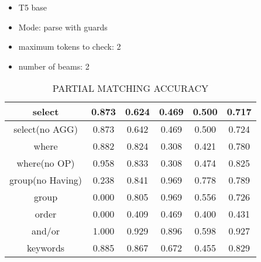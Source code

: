 \begin{itemize}
    \item T5 base
    \item Mode: parse with guards
    \item maximum tokens to check: 2
    \item number of beams: 2
\end{itemize}

\begin{table}[h!]
    \centering
    \begin{tabular}{|c|c|c|c|c|c|}
        \hline
        select           & 0.873 & 0.624 & 0.469 & 0.500 & 0.717 \\ \hline
        select(no AGG)   & 0.873 & 0.642 & 0.469 & 0.500 & 0.724 \\ \hline
        where            & 0.882 & 0.824 & 0.308 & 0.421 & 0.780 \\ \hline
        where(no OP)     & 0.958 & 0.833 & 0.308 & 0.474 & 0.825 \\ \hline
        group(no Having) & 0.238 & 0.841 & 0.969 & 0.778 & 0.789 \\ \hline
        group            & 0.000 & 0.805 & 0.969 & 0.556 & 0.726 \\ \hline
        order            & 0.000 & 0.409 & 0.469 & 0.400 & 0.431 \\ \hline
        and/or           & 1.000 & 0.929 & 0.896 & 0.598 & 0.927 \\ \hline

        keywords         & 0.885 & 0.867 & 0.672 & 0.455 & 0.829 \\ \hline
    \end{tabular}
    \caption{PARTIAL MATCHING ACCURACY}
\end{table}


